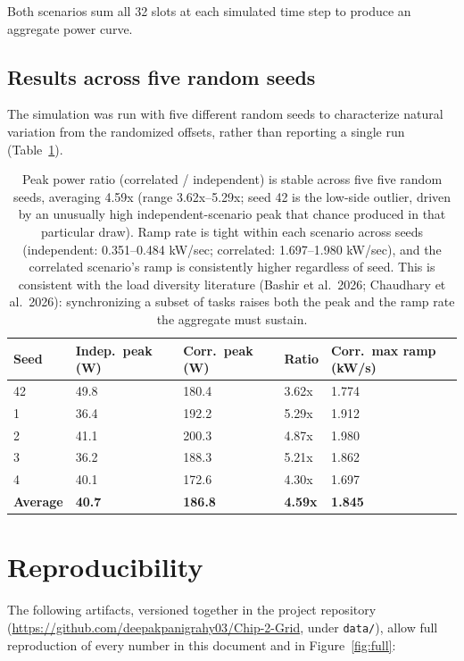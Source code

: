 \documentclass[10pt]{article}
\begin{document}
Both scenarios sum all 32 slots at each simulated time step to produce an
aggregate power curve.

\subsection{Results across five random seeds}

The simulation was run with five different random seeds to characterize
natural variation from the randomized offsets, rather than reporting a
single run (Table~\ref{tab:fiveseed}).

\begin{table}[h]
\centering
\small
\begin{tabularx}{\textwidth}{lXXXX}
\toprule
\textbf{Seed} & \textbf{Indep.\ peak (W)} & \textbf{Corr.\ peak (W)} & \textbf{Ratio} & \textbf{Corr.\ max ramp (kW/s)} \\
\midrule
42 & 49.8 & 180.4 & 3.62x & 1.774 \\
1 & 36.4 & 192.2 & 5.29x & 1.912 \\
2 & 41.1 & 200.3 & 4.87x & 1.980 \\
3 & 36.2 & 188.3 & 5.21x & 1.862 \\
4 & 40.1 & 172.6 & 4.30x & 1.697 \\
\midrule
\textbf{Average} & \textbf{40.7} & \textbf{186.8} & \textbf{4.59x} & \textbf{1.845} \\
\bottomrule
\end{tabularx}
\vspace{-2pt}
\caption{Peak power ratio (correlated / independent) is stable across five
five random seeds, averaging 4.59x (range 3.62x--5.29x; seed 42 is the
low-side outlier, driven by an unusually high independent-scenario peak
that chance produced in that particular draw). Ramp rate is tight within
each scenario across seeds (independent: 0.351--0.484 kW/sec; correlated:
1.697--1.980 kW/sec), and the correlated scenario's ramp is consistently
higher regardless of seed. This is consistent with the load diversity
literature (Bashir et al.\ 2026; Chaudhary et al.\ 2026): synchronizing a
subset of tasks raises both the peak and the ramp rate the aggregate must
sustain.}
\label{tab:fiveseed}
\end{table}

\section{Reproducibility}

The following artifacts, versioned together in the project repository
(\url{https://github.com/deepakpanigrahy03/Chip-2-Grid}, under
\texttt{data/}), allow full reproduction of every number in this document
and in Figure~\ref{fig:full}:
\end{document}
